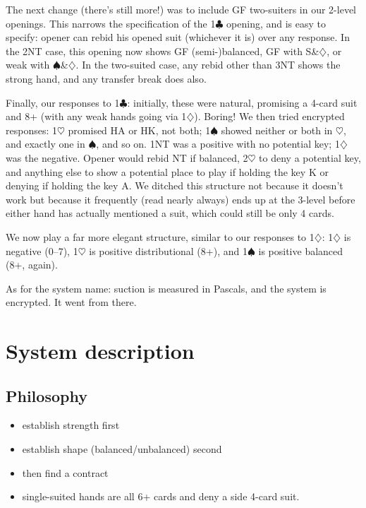 \documentclass[a4paper,12pt]{article}
\begin{document}
The next change (there's still more!) was to include GF two-suiters in our
2-level openings.  This narrows the specification of the 1$\clubsuit$ opening, and is
easy to specify: opener can rebid his opened suit (whichever it is) over any
response.  In the 2NT case, this opening now shows GF (semi-)balanced, GF with
S\&$\diamondsuit$, or weak with $\spadesuit$\&$\diamondsuit$.  In the two-suited case, any rebid other than 3NT shows
the strong hand, and any transfer break does also.

Finally, our responses to 1$\clubsuit$: initially, these were natural, promising a 4-card
suit and 8+ (with any weak hands going via 1$\diamondsuit$).  Boring!  We then tried
encrypted responses: 1$\heartsuit$ promised HA or HK, not both; 1$\spadesuit$ showed neither or both
in $\heartsuit$, and exactly one in $\spadesuit$, and so on.  1NT was a positive with no potential
key; 1$\diamondsuit$ was the negative.  Opener would rebid NT if balanced, 2$\heartsuit$ to deny a
potential key, and anything else to show a potential place to play if holding
the key K or denying if holding the key A.  We ditched this structure not
because it doesn't work but because it frequently (read nearly always) ends up
at the 3-level before either hand has actually mentioned a suit, which could
still be only 4 cards.

We now play a far more elegant structure, similar to our responses to 1$\diamondsuit$: 1$\diamondsuit$ is
negative (0--7), 1$\heartsuit$ is positive distributional (8+), and 1$\spadesuit$ is positive balanced
(8+, again).

As for the system name: suction is measured in Pascals, and the system is
encrypted.  It went from there.

\section{System description}

\subsection{Philosophy}

\begin{itemize}
\item establish strength first
\item establish shape (balanced/unbalanced) second
\item then find a contract
\item single-suited hands are all 6+ cards and deny a side 4-card suit.
\end{itemize}
\end{document}
